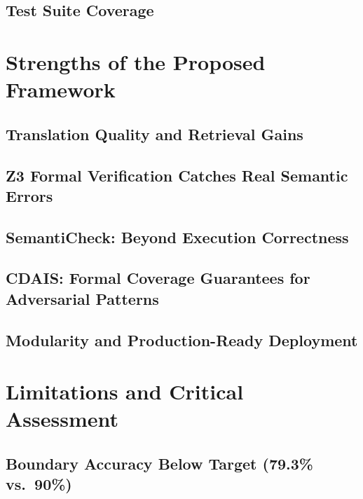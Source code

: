 \documentclass[12pt,a4paper]{report}
\begin{document}
  \subsection{Test Suite Coverage}
  \label{subsec:test-coverage}

\section{Strengths of the Proposed Framework}
\label{sec:strengths}

  \subsection{Translation Quality and Retrieval Gains}
  \label{subsec:strength-success}

  \subsection{Z3 Formal Verification Catches Real Semantic Errors}
  \label{subsec:strength-z3}

  \subsection{SemantiCheck: Beyond Execution Correctness}
  \label{subsec:strength-semanticheck}

  \subsection{CDAIS: Formal Coverage Guarantees for Adversarial Patterns}
  \label{subsec:strength-cdais}

  \subsection{Modularity and Production-Ready Deployment}
  \label{subsec:strength-modularity}

\section{Limitations and Critical Assessment}
\label{sec:limitations}

  \subsection{Boundary Accuracy Below Target (79.3\% vs.\ 90\%)}
  \label{subsec:limit-boundary}
\end{document}
